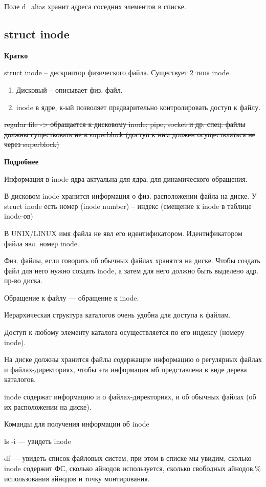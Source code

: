 Поле d\_alias хранит адреса соседних элементов в списке.

\subsection{struct inode}

\textbf{Кратко}

struct inode -- дескриптор физического файла. Существует 2 типа inode.
\begin{enumerate}
    \item Дисковый -- описывает физ. файл.
    \item inode в ядре, к-ый позволяет предварительно контролировать доступ к файлу.
\end{enumerate}

\sout{regular file -> обращается к дисковому inode; pipe, socket и др. спец. файлы должны существовать не в superblock (доступ к ним должен осуществляться не через superblock)}

\textbf{Подробнее}

\sout{Информация в inode ядра актуальна для ядра, для динамического обращения.}

В дисковом inode хранится информация о физ. расположении файла на диске. У struct inode есть номер (inode number) -- индекс (смещение к inode в таблице inode-ов)

В UNIX/LINUX имя файла не явл его идентификатором. Идентификатором файла явл. номер inode.

Физ. файлы, если говорить об обычных файлах хранятся на диске. Чтобы создать файл для него нужно создать inode, а затем для него должно быть выделено адр. пр-во диска.

Обращение к файлу --- обращение к inode.

Иерархическая структура каталогов очень удобна для доступа к файлам.

Доступ к любому элементу каталога осуществляется по его индексу (номеру inode).

На диске должны хранится файлы содержащие информацию о регулярных файлах и файлах-директориях, чтобы  эта информация мб представлена в виде дерева каталогов.

inode содержат информацию и о файлах-директориях, и об обычных файлах (об их расположении на диске).

Команды для получения информации об inode

ls -i --- увидеть inode

df --- увидеть список файловых систем, при этом в списке мы увидим, сколько inode содержит ФС, сколько айнодов используется, сколько свободных айнодов,\% использования айнодов и точку монтирования.

